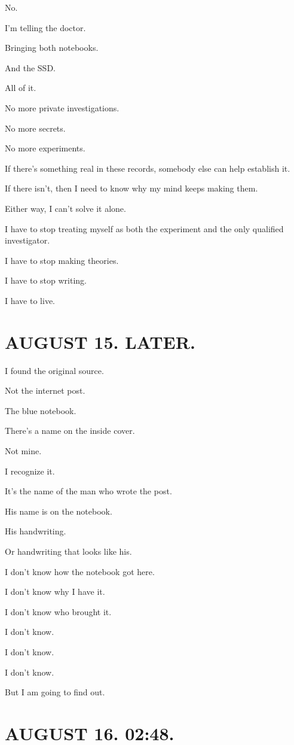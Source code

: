 \documentclass[11pt,oneside]{book}
\begin{document}
No.

I'm telling the doctor.

Bringing both notebooks.

And the SSD.

All of it.

No more private investigations.

No more secrets.

No more experiments.

If there's something real in these records, somebody else can help establish it.

If there isn't, then I need to know why my mind keeps making them.

Either way, I can't solve it alone.

I have to stop treating myself as both the experiment and the only qualified investigator.

I have to stop making theories.

I have to stop writing.

I have to live.

\section*{AUGUST 15. LATER.}

I found the original source.

Not the internet post.

The blue notebook.

There's a name on the inside cover.

Not mine.

I recognize it.

It's the name of the man who wrote the post.

His name is on the notebook.

His handwriting.

Or handwriting that looks like his.

I don't know how the notebook got here.

I don't know why I have it.

I don't know who brought it.

I don't know.

I don't know.

I don't know.

But I am going to find out.

\section*{AUGUST 16. 02:48.}
\end{document}
